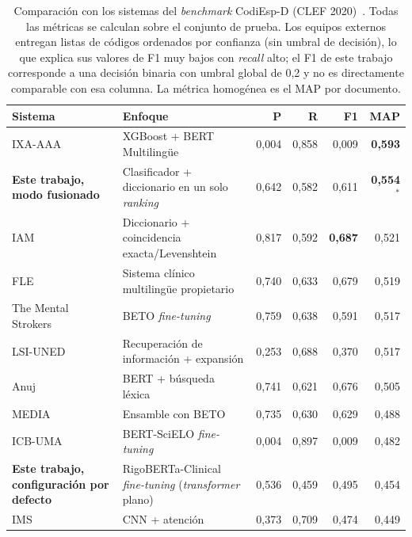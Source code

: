 \begin{table}[h]
\centering
\small
\caption{Comparación con los sistemas del \emph{benchmark} CodiEsp-D (CLEF 2020)~\protect\cite{miranda2020}. Todas las métricas se calculan sobre el conjunto de prueba. Los equipos externos entregan listas de códigos ordenados por confianza (sin umbral de decisión), lo que explica sus valores de F1 muy bajos con \emph{recall} alto; el F1 de este trabajo corresponde a una decisión binaria con umbral global de 0,2 y no es directamente comparable con esa columna. La métrica homogénea es el MAP por documento.}
\label{tab:codiesp-comparativa}
\begin{tabular}{llrrrr}
\hline
\textbf{Sistema} & \textbf{Enfoque} & \textbf{P} & \textbf{R} & \textbf{F1} & \textbf{MAP} \\
\hline
IXA-AAA & XGBoost + BERT Multilingüe & 0{,}004 & 0{,}858 & 0{,}009 & \textbf{0{,}593} \\
\rowcolor{gray!15}
\textbf{Este trabajo, modo fusionado} & Clasificador + diccionario en un solo \emph{ranking} & 0{,}642 & 0{,}582 & 0{,}611 & \textbf{0{,}554}$^{*}$ \\
IAM & Diccionario + coincidencia exacta/Levenshtein & 0{,}817 & 0{,}592 & \textbf{0{,}687} & 0{,}521 \\
FLE & Sistema clínico multilingüe propietario & 0{,}740 & 0{,}633 & 0{,}679 & 0{,}519 \\
The Mental Strokers & BETO \emph{fine-tuning} & 0{,}759 & 0{,}638 & 0{,}591 & 0{,}517 \\
LSI-UNED & Recuperación de información + expansión & 0{,}253 & 0{,}688 & 0{,}370 & 0{,}517 \\
Anuj & BERT + búsqueda léxica & 0{,}741 & 0{,}621 & 0{,}676 & 0{,}505 \\
MEDIA & Ensamble con BETO & 0{,}735 & 0{,}630 & 0{,}629 & 0{,}488 \\
ICB-UMA~\cite{lopezgarcia2020icb} & BERT-SciELO \emph{fine-tuning} & 0{,}004 & 0{,}897 & 0{,}009 & 0{,}482 \\
\rowcolor{gray!15}
\textbf{Este trabajo, configuración por defecto} & RigoBERTa-Clinical \emph{fine-tuning} (\emph{transformer} plano) & 0{,}536 & 0{,}459 & 0{,}495 & 0{,}454 \\
IMS & CNN + atención & 0{,}373 & 0{,}709 & 0{,}474 & 0{,}449 \\
\hline
\end{tabular}


\end{table}
